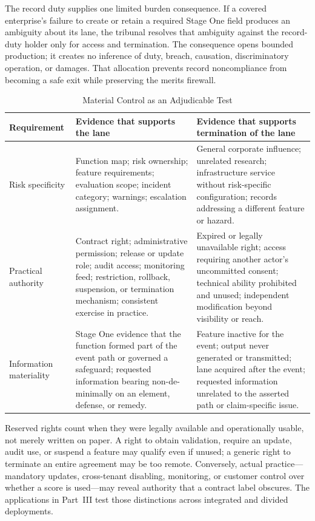 The record duty supplies one limited burden consequence. If a covered enterprise's failure to create or retain a required Stage One field produces an ambiguity about its lane, the tribunal resolves that ambiguity against the record-duty holder only for access and termination. The consequence opens bounded production; it creates no inference of duty, breach, causation, discriminatory operation, or damages. That allocation prevents record noncompliance from becoming a safe exit while preserving the merits firewall.

\begin{table}[htbp]
\centering
\caption{Material Control as an Adjudicable Test}
\label{tab:material-control-proof}
\small
\begin{tabularx}{\textwidth}{>{\raggedright\arraybackslash}p{} >{\raggedright\arraybackslash}p{} X}
\toprule
Requirement & Evidence that supports the lane & Evidence that supports termination of the lane \\
\midrule
Risk specificity & Function map; risk ownership; feature requirements; evaluation scope; incident category; warnings; escalation assignment. & General corporate influence; unrelated research; infrastructure service without risk-specific configuration; records addressing a different feature or hazard. \\
Practical authority & Contract right; administrative permission; release or update role; audit access; monitoring feed; restriction, rollback, suspension, or termination mechanism; consistent exercise in practice. & Expired or legally unavailable right; access requiring another actor's uncommitted consent; technical ability prohibited and unused; independent modification beyond visibility or reach. \\
Information materiality & Stage One evidence that the function formed part of the event path or governed a safeguard; requested information bearing non-de-minimally on an element, defense, or remedy. & Feature inactive for the event; output never generated or transmitted; lane acquired after the event; requested information unrelated to the asserted path or claim-specific issue. \\
\bottomrule
\end{tabularx}
\end{table}

Reserved rights count when they were legally available and operationally usable, not merely written on paper. A right to obtain validation, require an update, audit use, or suspend a feature may qualify even if unused; a generic right to terminate an entire agreement may be too remote. Conversely, actual practice---mandatory updates, cross-tenant disabling, monitoring, or customer control over whether a score is used---may reveal authority that a contract label obscures. The applications in Part~III test those distinctions across integrated and divided deployments.

